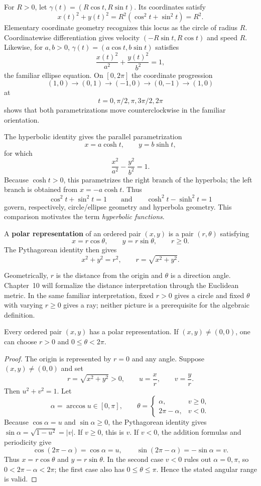 For $R>0$, let $\gamma(t)=(R\cos t,R\sin t)$. Its coordinates satisfy
\[
x(t)^2+y(t)^2=R^2(\cos^2t+\sin^2t)=R^2.
\]
Elementary coordinate geometry recognizes this locus as the circle of radius
$R$. Coordinatewise differentiation gives velocity
$(-R\sin t,R\cos t)$ and speed $R$. Likewise, for $a,b>0$,
$\gamma(t)=(a\cos t,b\sin t)$ satisfies
\[
\frac{x(t)^2}{a^2}+\frac{y(t)^2}{b^2}=1,
\]
the familiar ellipse equation. On $[0,2\pi]$ the coordinate progression
\[
(1,0)\to(0,1)\to(-1,0)\to(0,-1)\to(1,0)
\]
at
\[
t=0,\pi/2,\pi,3\pi/2,2\pi
\]
shows that both parametrizations move
counterclockwise in the familiar orientation.

The hyperbolic identity gives the parallel parametrization
\[
x=a\cosh t,\qquad y=b\sinh t,
\]
for which
\[
\boxed{\frac{x^2}{a^2}-\frac{y^2}{b^2}=1.}
\]
Because \(\cosh t>0\), this parametrizes the right branch of the hyperbola;
the left branch is obtained from \(x=-a\cosh t\). Thus
\[
\cos^2t+\sin^2t=1
\qquad\text{and}\qquad
\cosh^2t-\sinh^2t=1
\]
govern, respectively, circle/ellipse geometry and hyperbola geometry. This
comparison motivates the term \emph{hyperbolic functions}.

\begin{definition}\label{def:polar-coordinates}
A \textbf{polar representation} of an ordered pair $(x,y)$ is a pair
$(r,\theta)$ satisfying
\[
\boxed{x=r\cos\theta,\qquad y=r\sin\theta,\qquad r\geq0.}
\]
The Pythagorean identity then gives
\[
x^2+y^2=r^2,
\qquad
\boxed{r=\sqrt{x^2+y^2}}.
\]
\end{definition}

Geometrically, $r$ is the distance from the origin and $\theta$ is a
direction angle. Chapter~10 will formalize the distance interpretation
through the Euclidean metric. In the same familiar interpretation, fixed
$r>0$ gives a circle and fixed $\theta$ with varying $r\geq0$ gives a ray;
neither picture is a prerequisite for the algebraic definition.

\begin{proposition}
\label{prop:polar-existence}
Every ordered pair $(x,y)$ has a polar representation. If $(x,y)\ne(0,0)$,
one can choose $r>0$ and $0\leq\theta<2\pi$.
\end{proposition}
\begin{proof}
The origin is represented by $r=0$ and any angle. Suppose
$(x,y)\ne(0,0)$ and set
\[
r=\sqrt{x^2+y^2}>0,
\qquad
u=\frac{x}{r},
\qquad
v=\frac{y}{r}.
\]
Then $u^2+v^2=1$. Let
\[
\alpha=\arccos u\in[0,\pi],
\qquad
\theta=
\begin{cases}
\alpha,&v\geq0,\\
2\pi-\alpha,&v<0.
\end{cases}
\]
Because $\cos\alpha=u$ and $\sin\alpha\geq0$, the Pythagorean identity
gives $\sin\alpha=\sqrt{1-u^2}=|v|$. If $v\geq0$, this is $v$. If
$v<0$, the addition formulas and periodicity give
\[
\cos(2\pi-\alpha)=\cos\alpha=u,
\qquad
\sin(2\pi-\alpha)=-\sin\alpha=v.
\]
Thus $x=r\cos\theta$ and $y=r\sin\theta$. In the second case $v<0$
rules out $\alpha=0,\pi$, so $0<2\pi-\alpha<2\pi$; the first case also
has $0\leq\theta\leq\pi$. Hence the stated angular range is valid.
\end{proof}


